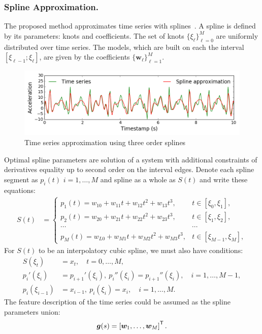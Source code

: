 \documentclass{llncs}
\newcommand{\T}{{\mbox{\scriptsize\sffamily\upshape\mdseries T}}}
\begin{document}
\subsubsection{Spline Approximation.}
The proposed method approximates time series with splines~\cite{deboor1978splines}. A spline is defined by its parameters: knots and coefficients.
The set of knots $\{\xi_\ell\}_{\ell=0}^M$ are uniformly distributed over time series.
The models, which are built on each the interval $[\xi_{\ell-1}; \xi_{\ell}]$, are given by the coefficients $\{\mathbf{w}_\ell\}_{\ell=1}^{M}$.
\begin{figure}[h]
	\centering
	\includegraphics[width=1\linewidth]{figs/spline_example.png}
	\caption{Time series approximation using three order splines}
	\label{fig::spline_example}
\end{figure}
Optimal spline parameters are solution of a system with additional constraints of derivatives equality up to second order on the interval edges. Denote each spline segment as $p_i(t)$ $i = 1, \dots, M$ and spline as a whole as $S(t)$ and write these equations:
\begin{align*}
S(t) &= \begin{cases}
p_1(t) = w_{10} +w_{11}t + w_{12}t^2 + w_{13}t^3, & t\in [\xi_0, \xi_1],\\
p_2(t) = w_{20} +w_{21}t + w_{22}t^2 + w_{23}t^3, & t\in [\xi_1, \xi_2],\\
\cdots&\cdots \\
p_{M}(t) = w_{L0} +w_{M1}t + w_{M2}t^2 + w_{M3}t^3, & t\in [\xi_{M-1}, \xi_M],					
\end{cases}
\end{align*}
For $S(t)$ to be an interpolatory cubic spline, we must also have conditions:
\begin{align*}
S(\xi_t) &= x_t, \quad t = 0, \dots, M,\\
p_i'(\xi_i) &= p_{i+1}'(\xi_i),\: p_i''(\xi_i) = p_{i+1}''(\xi_i), \quad i = 1, \dots, M-1,\\
p_i(\xi_{i-1}) &= x_{i-1},\: p_i(\xi_i) = x_i, \quad i = 1, \dots, M.
\end{align*}
The feature description of the time series could be assumed as the spline parameters union:
\[
\bm{g}(s) = \left[\bm{w}_1, \dots, \bm{w}_{M}\right]^{\T}.
\]
\end{document}
